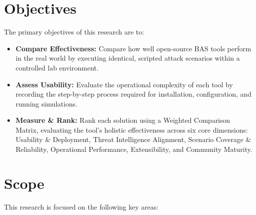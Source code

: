 \section{Objectives}\label{sec:Objectives}
The primary objectives of this research are to:
\begin{itemize}
    \item \textbf{Compare Effectiveness:} Compare how well open-source BAS tools perform in the real world by executing identical, scripted attack scenarios within a controlled lab environment.
    
    \item \textbf{Assess Usability:} Evaluate the operational complexity of each tool by recording the step-by-step process required for installation, configuration, and running simulations.
    
    \item \textbf{Measure \& Rank:} Rank each solution using a Weighted Comparison Matrix, evaluating the tool's holistic effectiveness across six core dimensions: Usability \& Deployment, Threat Intelligence Alignment, Scenario Coverage \& Reliability, Operational Performance, Extensibility, and Community Maturity.
\end{itemize}

\section{Scope}\label{sec:Scope}
This research is focused on the following key areas:

